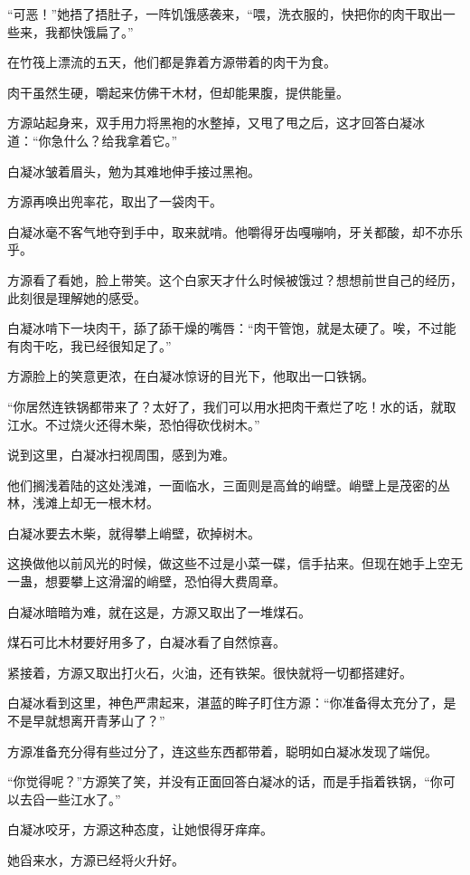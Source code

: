 \begin{this_body}
“可恶！”她捂了捂肚子，一阵饥饿感袭来，“喂，洗衣服的，快把你的肉干取出一些来，我都快饿扁了。”

在竹筏上漂流的五天，他们都是靠着方源带着的肉干为食。

肉干虽然生硬，嚼起来仿佛干木材，但却能果腹，提供能量。

方源站起身来，双手用力将黑袍的水整掉，又甩了甩之后，这才回答白凝冰道：“你急什么？给我拿着它。”

白凝冰皱着眉头，勉为其难地伸手接过黑袍。

方源再唤出兜率花，取出了一袋肉干。

白凝冰毫不客气地夺到手中，取来就啃。他嚼得牙齿嘎嘣响，牙关都酸，却不亦乐乎。

方源看了看她，脸上带笑。这个白家天才什么时候被饿过？想想前世自己的经历，此刻很是理解她的感受。

白凝冰啃下一块肉干，舔了舔干燥的嘴唇：“肉干管饱，就是太硬了。唉，不过能有肉干吃，我已经很知足了。”

方源脸上的笑意更浓，在白凝冰惊讶的目光下，他取出一口铁锅。

“你居然连铁锅都带来了？太好了，我们可以用水把肉干煮烂了吃！水的话，就取江水。不过烧火还得木柴，恐怕得砍伐树木。”

说到这里，白凝冰扫视周围，感到为难。

他们搁浅着陆的这处浅滩，一面临水，三面则是高耸的峭壁。峭壁上是茂密的丛林，浅滩上却无一根木材。

白凝冰要去木柴，就得攀上峭壁，砍掉树木。

这换做他以前风光的时候，做这些不过是小菜一碟，信手拈来。但现在她手上空无一蛊，想要攀上这滑溜的峭壁，恐怕得大费周章。

白凝冰暗暗为难，就在这是，方源又取出了一堆煤石。

煤石可比木材要好用多了，白凝冰看了自然惊喜。

紧接着，方源又取出打火石，火油，还有铁架。很快就将一切都搭建好。

白凝冰看到这里，神色严肃起来，湛蓝的眸子盯住方源：“你准备得太充分了，是不是早就想离开青茅山了？”

方源准备充分得有些过分了，连这些东西都带着，聪明如白凝冰发现了端倪。

“你觉得呢？”方源笑了笑，并没有正面回答白凝冰的话，而是手指着铁锅，“你可以去舀一些江水了。”

白凝冰咬牙，方源这种态度，让她恨得牙痒痒。

她舀来水，方源已经将火升好。


\end{this_body}
